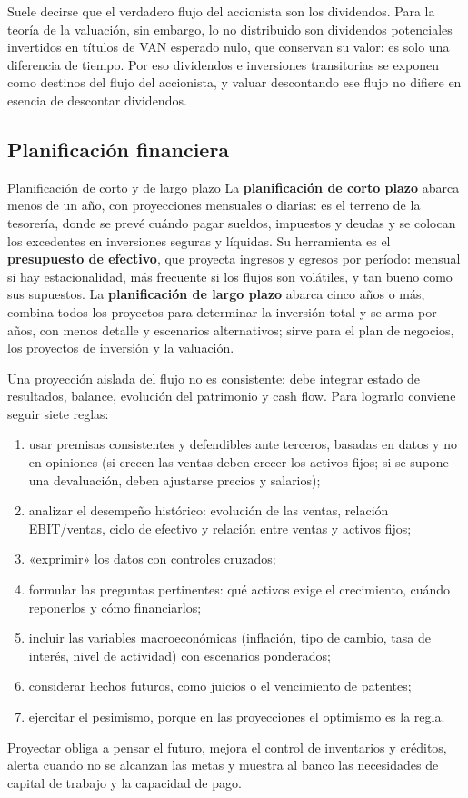 Suele decirse que el verdadero flujo del accionista son los dividendos. Para la teoría de la valuación, sin embargo, lo no distribuido son dividendos potenciales invertidos en títulos de VAN esperado nulo, que conservan su valor: es solo una diferencia de tiempo. Por eso dividendos e inversiones transitorias se exponen como destinos del flujo del accionista, y valuar descontando ese flujo no difiere en esencia de descontar dividendos.

\subsection{Planificación financiera}

\begin{definicion}{Planificación de corto y de largo plazo}
La \textbf{planificación de corto plazo} abarca menos de un año, con proyecciones mensuales o diarias: es el terreno de la tesorería, donde se prevé cuándo pagar sueldos, impuestos y deudas y se colocan los excedentes en inversiones seguras y líquidas. Su herramienta es el \textbf{presupuesto de efectivo}, que proyecta ingresos y egresos por período: mensual si hay estacionalidad, más frecuente si los flujos son volátiles, y tan bueno como sus supuestos. La \textbf{planificación de largo plazo} abarca cinco años o más, combina todos los proyectos para determinar la inversión total y se arma por años, con menos detalle y escenarios alternativos; sirve para el plan de negocios, los proyectos de inversión y la valuación.
\end{definicion}

Una proyección aislada del flujo no es consistente: debe integrar estado de resultados, balance, evolución del patrimonio y cash flow. Para lograrlo conviene seguir siete reglas:
\begin{enumerate}
\item usar premisas consistentes y defendibles ante terceros, basadas en datos y no en opiniones (si crecen las ventas deben crecer los activos fijos; si se supone una devaluación, deben ajustarse precios y salarios);
\item analizar el desempeño histórico: evolución de las ventas, relación EBIT/ventas, ciclo de efectivo y relación entre ventas y activos fijos;
\item «exprimir» los datos con controles cruzados;
\item formular las preguntas pertinentes: qué activos exige el crecimiento, cuándo reponerlos y cómo financiarlos;
\item incluir las variables macroeconómicas (inflación, tipo de cambio, tasa de interés, nivel de actividad) con escenarios ponderados;
\item considerar hechos futuros, como juicios o el vencimiento de patentes;
\item ejercitar el pesimismo, porque en las proyecciones el optimismo es la regla.
\end{enumerate}
Proyectar obliga a pensar el futuro, mejora el control de inventarios y créditos, alerta cuando no se alcanzan las metas y muestra al banco las necesidades de capital de trabajo y la capacidad de pago.

